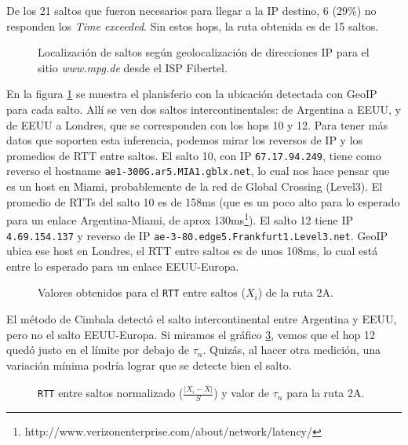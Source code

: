De los 21 saltos que fueron necesarios para llegar a la IP destino, 6 (29\%) no responden los \emph{Time exceeded}. Sin estos hops, la ruta obtenida es de 15 saltos.

\begin{figure}[H]
    \caption{Localización de saltos según geolocalización de direcciones IP para
    el sitio \emph{www.mpg.de} desde el ISP Fibertel.}
    \label{res:escb1:map}
\end{figure}

En la figura \ref{res:escb1:map} se muestra el planisferio con la ubicación detectada con GeoIP para cada salto. Allí se ven dos saltos intercontinentales: de Argentina a EEUU, y de EEUU a Londres, que se corresponden con los hops 10 y 12. Para tener más datos que soporten esta inferencia, podemos mirar los reversos de IP y los promedios de RTT entre saltos. El salto 10, con IP \texttt{67.17.94.249}, tiene como reverso el hostname \texttt{ae1-300G.ar5.MIA1.gblx.net}, lo cual nos hace pensar que es un host en Miami, probablemente de la red de Global Crossing (Level3). El promedio de RTTs del salto 10 es de 158ms (que es un poco alto para lo esperado para un enlace Argentina-Miami, de aprox 130ms\footnote{http://www.verizonenterprise.com/about/network/latency/}). El salto 12 tiene IP \texttt{4.69.154.137} y reverso de IP \texttt{ae-3-80.edge5.Frankfurt1.Level3.net}. GeoIP ubica ese host en Londres, el RTT entre saltos es de unos 108ms, lo cual está entre lo esperado para un enlace EEUU-Europa.

\begin{figure}[H]
    \caption{Valores obtenidos para el \texttt{RTT} entre saltos ($X_i$) de la ruta 2A.}
    \label{res:escb1:rtt}
\end{figure}

El método de Cimbala detectó el salto intercontinental entre Argentina y EEUU, pero no el salto EEUU-Europa. Si miramos el gráfico \ref{res:escb1:rttnorm}, vemos que el hop 12 quedó justo en el límite por debajo de $\tau_n$. Quizás, al hacer otra medición, una variación mínima podría lograr que se detecte bien el salto.

\begin{figure}[H]
    \caption{\texttt{RTT} entre saltos normalizado ($\frac{\vert X_i-\bar{X}\vert}{S}$)
    y valor de $\tau_n$ para la ruta 2A.}
    \label{res:escb1:rttnorm}
\end{figure}

